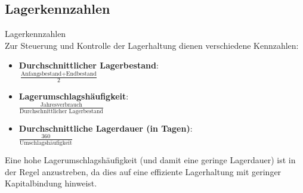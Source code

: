 \subsection{Lagerkennzahlen}

\begin{definition}{Lagerkennzahlen}\\
Zur Steuerung und Kontrolle der Lagerhaltung dienen verschiedene Kennzahlen:
\begin{itemize}
    \item \textbf{Durchschnittlicher Lagerbestand}: \\
    $\frac{\text{Anfangsbestand} + \text{Endbestand}}{2}$
    \item \textbf{Lagerumschlagshäufigkeit}: \\
    $\frac{\text{Jahresverbrauch}}{\text{Durchschnittlicher Lagerbestand}}$
    \item \textbf{Durchschnittliche Lagerdauer (in Tagen)}: \\
    $\frac{360}{\text{Umschlagshäufigkeit}}$
\end{itemize}

Eine hohe Lagerumschlagshäufigkeit (und damit eine geringe Lagerdauer) ist in der Regel anzustreben, da dies auf eine effiziente Lagerhaltung mit geringer Kapitalbindung hinweist.
\end{definition}

